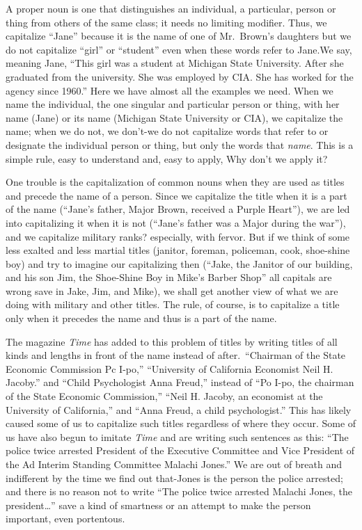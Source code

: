 \documentclass[
    oneside,
    11pt,
]{memoir}
\begin{document}
A proper noun is one that distinguishes an individual, a particular, person or thing from others of the same class; it needs no limiting modifier. Thus, we capitalize \enquote{Jane} because it is the name of one of Mr.\ Brown's daughters but we do not capitalize \enquote{girl} or \enquote{student} even when these words refer to Jane.We say, meaning Jane, \enquote{This girl was a student at Michigan State University. After she graduated from the university. She was employed by CIA. She has worked for the agency since 1960.} Here we have almost all the examples we need. When we name the individual, the one singular and particular person or thing, with her name (Jane) or its name (Michigan State University or CIA), we capitalize the name; when we do not, we don't-we do not capitalize words that refer to or designate the individual person or thing, but only the words that \emph{name}. This is a simple rule, easy to understand and, easy to apply, Why don't we apply it? 

One trouble is the capitalization of common nouns when they are used as titles and precede the name of a person. Since we capitalize the title when it is a part of the name (\enquote{Jane's father, Major Brown, received a Purple Heart}), we are led into capitalizing it when it is not (\enquote{Jane's father was a Major during the war}), and we capitalize military ranks? especially, with fervor. But if we think of some less exalted and less martial titles (janitor, foreman, policeman, cook, shoe-shine boy) and try to imagine our capitalizing then (\enquote{Jake, the Janitor of our building, and his son Jim, the Shoe-Shine Boy in Mike's Barber Shop} all capitals are wrong save in Jake, Jim, and Mike), we shall get another view of what we are doing with military and other titles. The rule, of course, is to capitalize a title only when it precedes the name and thus is a part of the name. 

The magazine \emph{Time} has added to this problem of titles by writing titles of all kinds and lengths in front of the name instead of after.\ \enquote{Chairman of the State Economic Commission Pc I-po,} \enquote{University of California Economist Neil H. Jacoby.} and \enquote{Child Psychologist Anna Freud,} instead of \enquote{Po I-po, the chairman of the State Economic Commission,} \enquote{Neil H. Jacoby, an economist at the University of California,} and \enquote{Anna Freud, a child psychologist.} This has likely caused some of us to capitalize such titles regardless of where they occur. Some of us have also begun to imitate \emph{Time} and are writing such sentences as this: \enquote{The police twice arrested President of the Executive Committee and Vice President of the Ad Interim Standing Committee Malachi Jones.} We are out of breath and indifferent by the time we find out that-Jones is the person the police arrested; and there is no reason not to write \enquote{The police twice arrested Malachi Jones, the president\dots} save a kind of smartness or an attempt to make the person important, even portentous.
\end{document}
